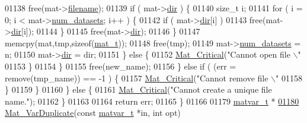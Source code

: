 \begin{DoxyCode}
{{{{{{{{{{{{{{{{{{{{{{{{{{{{01138                             free(mat->\hyperlink{struct__mat__t_a340b191598135edd03b6dec847f0b1b1}{filename});
01139                         \textcolor{keywordflow}{if} ( mat->\hyperlink{struct__mat__t_a1bc6c604459d0787801d5e53d365684c}{dir} ) \{
01140                             \textcolor{keywordtype}{size\_t} i;
01141                             \textcolor{keywordflow}{for} ( i = 0; i < mat->\hyperlink{struct__mat__t_af37d0ba323e65edb27ecd5a2f766a3a4}{num\_datasets}; i++ ) \{
01142                                 \textcolor{keywordflow}{if} ( mat->\hyperlink{struct__mat__t_a1bc6c604459d0787801d5e53d365684c}{dir}[i] )
01143                                     free(mat->\hyperlink{struct__mat__t_a1bc6c604459d0787801d5e53d365684c}{dir}[i]);
01144                             \}
01145                             free(mat->\hyperlink{struct__mat__t_a1bc6c604459d0787801d5e53d365684c}{dir});
01146                         \}
01147                         memcpy(mat,tmp,\textcolor{keyword}{sizeof}(\hyperlink{struct__mat__t}{mat\_t}));
01148                         free(tmp);
01149                         mat->\hyperlink{struct__mat__t_af37d0ba323e65edb27ecd5a2f766a3a4}{num\_datasets} = n;
01150                         mat->\hyperlink{struct__mat__t_a1bc6c604459d0787801d5e53d365684c}{dir} = dir;
01151                     \} \textcolor{keywordflow}{else} \{
01152                         \hyperlink{group__mat__util_gaf51f2bfbb5580f575e4dd79757e2b80c}{Mat\_Critical}(\textcolor{stringliteral}{"Cannot open file \(\backslash\)"%
01153                     \}
01154                 \}
01155                 free(new\_name);
01156             \} \textcolor{keywordflow}{else} \textcolor{keywordflow}{if} ( (err = \textcolor{keyword}{remove}(tmp\_name)) == -1 ) \{
01157                 \hyperlink{group__mat__util_gaf51f2bfbb5580f575e4dd79757e2b80c}{Mat\_Critical}(\textcolor{stringliteral}{"Cannot remove file \(\backslash\)"%
01158             \}
01159         \}
01160     \} \textcolor{keywordflow}{else} \{
01161         \hyperlink{group__mat__util_gaf51f2bfbb5580f575e4dd79757e2b80c}{Mat\_Critical}(\textcolor{stringliteral}{"Cannot create a unique file name."});
01162     \}
01163 
01164     \textcolor{keywordflow}{return} err;
01165 \}
01166 
01179 \hyperlink{group___m_a_t_structmatvar__t}{matvar\_t} *
\hyperlink{group___m_a_t_ga7ef80c5d99d7918b2b09db3bea106ecc}{01180} \hyperlink{group___m_a_t_ga7ef80c5d99d7918b2b09db3bea106ecc}{Mat\_VarDuplicate}(\textcolor{keyword}{const} \hyperlink{group___m_a_t_structmatvar__t}{matvar\_t} *in, \textcolor{keywordtype}{int} opt)
}}}}}}}}}}}}}}}}}}}}}}}}}}}}}}
\end{DoxyCode}
